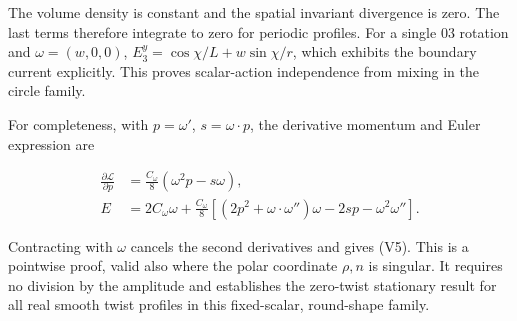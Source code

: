 The volume density is constant and the spatial invariant divergence is zero. The last terms therefore integrate to zero for periodic profiles. For a single 03 rotation and $\omega=(w,0,0)$, $E_3^y=\cos\chi/L+w\sin\chi/r$, which exhibits the boundary current explicitly. This proves scalar-action independence from mixing in the circle family.

For completeness, with $p=\omega'$, $s=\omega\cdot p$, the derivative momentum and Euler expression are

\begin{equation}\tag{E4}\label{eq:E4}
\begin{aligned}
\frac{\partial\mathcal L}{\partial p}
&=\frac{C_\omega}{8}(\omega^2p-s\omega),\\
E&=2C_\omega\omega+\frac{C_\omega}{8}
\left[(2p^2+\omega\cdot\omega'')\omega
-2sp-\omega^2\omega''\right].
\end{aligned}
\end{equation}

Contracting with $\omega$ cancels the second derivatives and gives (V5). This is a pointwise proof, valid also where the polar coordinate $\rho,n$ is singular. It requires no division by the amplitude and establishes the zero-twist stationary result for all real smooth twist profiles in this fixed-scalar, round-shape family.
